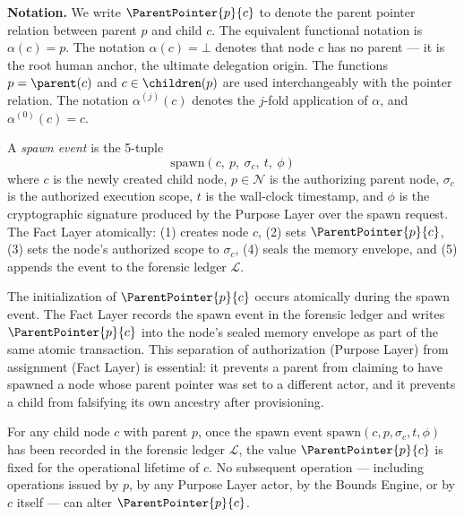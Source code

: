 \medskip
\noindent\textbf{Notation.} We write $\ParentPointer{p}{c}$ to denote the parent pointer relation between parent $p$ and child $c$. The equivalent functional notation is $\alpha(c) = p$. The notation $\alpha(c) = \bot$ denotes that node $c$ has no parent — it is the root human anchor, the ultimate delegation origin. The functions $p = \parent(c)$ and $c \in \children(p)$ are used interchangeably with the pointer relation. The notation $\alpha^{(j)}(c)$ denotes the $j$-fold application of $\alpha$, and $\alpha^{(0)}(c) = c$.

\begin{dfn}
\label{dfn:spawn-event}
A \emph{spawn event} is the 5-tuple
\begin{equation}
\mathrm{spawn}(c,\ p,\ \sigma_c,\ t,\ \phi)
\end{equation}
where $c$ is the newly created child node, $p \in \mathcal{N}$ is the authorizing parent node, $\sigma_c$ is the authorized execution scope, $t$ is the wall-clock timestamp, and $\phi$ is the cryptographic signature produced by the Purpose Layer over the spawn request. The Fact Layer atomically: (1) creates node $c$, (2) sets $\ParentPointer{p}{c}$, (3) sets the node's authorized scope to $\sigma_c$, (4) seals the memory envelope, and (5) appends the event to the forensic ledger $\mathcal{L}$.
\end{dfn}

The initialization of $\ParentPointer{p}{c}$ occurs atomically during the spawn event. The Fact Layer records the spawn event in the forensic ledger and writes $\ParentPointer{p}{c}$ into the node's sealed memory envelope as part of the same atomic transaction. This separation of authorization (Purpose Layer) from assignment (Fact Layer) is essential: it prevents a parent from claiming to have spawned a node whose parent pointer was set to a different actor, and it prevents a child from falsifying its own ancestry after provisioning.

\begin{prop}
\label{prop:parent-pointer-immutable}
For any child node $c$ with parent $p$, once the spawn event $\mathrm{spawn}(c, p, \sigma_c, t, \phi)$ has been recorded in the forensic ledger $\mathcal{L}$, the value $\ParentPointer{p}{c}$ is fixed for the operational lifetime of $c$. No subsequent operation — including operations issued by $p$, by any Purpose Layer actor, by the Bounds Engine, or by $c$ itself — can alter $\ParentPointer{p}{c}$.
\end{prop}

